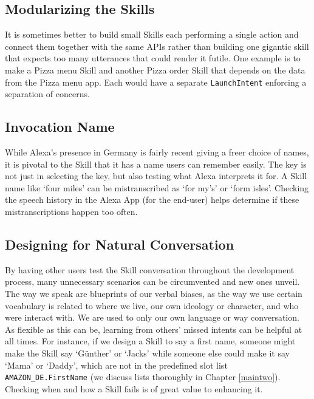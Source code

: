 \subsection*{Modularizing the Skills}
It is sometimes better to build small Skills each performing a single action and connect them together with the same APIs rather than building one gigantic skill that expects too many utterances that could render it futile. One example is to make a Pizza menu Skill and another Pizza order Skill that depends on the data from the Pizza menu app. Each would have a separate \texttt{LaunchIntent} enforcing a separation of concerns.


\subsection*{Invocation Name}

While Alexa's presence in Germany is fairly recent giving a freer choice of names, it is pivotal to the Skill that it has a name users can remember easily. The key is not just in selecting the key, but also testing what Alexa interprets it for. A Skill name like `four miles' can be mistranscribed as `for my's' or `form isles'. Checking the speech history in the Alexa App (for the end-user) helps determine if these mistranscriptions happen too often.


\subsection*{Designing for Natural Conversation}
By having other users test the Skill conversation throughout the development process, many unnecessary scenarios can be circumvented and new ones unveil. The way we speak are blueprints of our verbal biases, as the way we use certain vocabulary is related to where we live, our own ideology or character, and who were interact with. We are used to only our own language or way conversation. As flexible as this can be, learning from others' missed intents can be helpful at all times. For instance, if we design a Skill to say a first name, someone might make the Skill say `Günther' or `Jacks' while someone else could make it say `Mama' or `Daddy', which are not in the predefined slot list \texttt{AMAZON_DE.FirstName} (we discuss lists thoroughly in Chapter \ref{maintwo}). Checking when and how a Skill fails is of great value to enhancing it.\\



